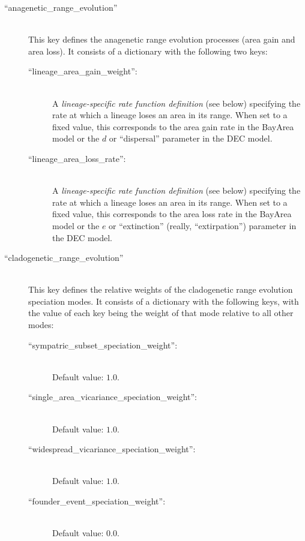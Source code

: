 \documentclass[11pt,openany]{memoir} %
\begin{document}
\begin{description}
    \item[``anagenetic\_range\_evolution'']  \hfill \\
        This key defines the anagenetic range evolution processes (area gain and area loss).
        It consists of a dictionary with the following two keys:
        \begin{description}
            \item[``lineage\_area\_gain\_weight'':] \hfill \\
                A \textit{lineage-specific rate function definition} (see below) specifying the rate at which a lineage loses an area in its range.
                When set to a fixed value, this corresponds to the area gain rate in the BayArea model or the $d$ or ``dispersal'' parameter in the DEC model.
            \item[``lineage\_area\_loss\_rate'':] \hfill \\
                A \textit{lineage-specific rate function definition} (see below) specifying the rate at which a lineage loses an area in its range.
                When set to a fixed value, this corresponds to the area loss rate in the BayArea model or the $e$ or ``extinction'' (really, ``extirpation'') parameter in the DEC model.
        \end{description}

    \item[``cladogenetic\_range\_evolution'']  \hfill \\
        This key defines the relative weights of the cladogenetic range evolution speciation modes.
        It consists of a dictionary with the following keys, with the value of each key being the weight of that mode relative to all other modes:
        \begin{description}
            \item[``sympatric\_subset\_speciation\_weight'':] \hfill \\
                Default value: $1.0$.
            \item[``single\_area\_vicariance\_speciation\_weight'':] \hfill \\
                Default value: $1.0$.
            \item[``widespread\_vicariance\_speciation\_weight'':] \hfill \\
                Default value: $1.0$.
            \item[``founder\_event\_speciation\_weight'':] \hfill \\
                Default value: $0.0$.
        \end{description}


\end{description}
\end{document}
